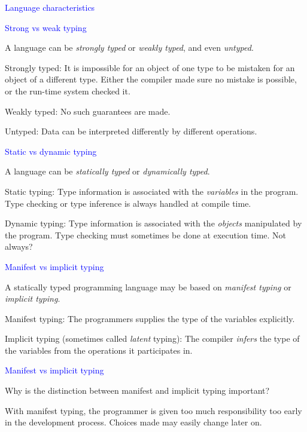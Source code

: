 \documentclass{slides}
\newcommand{\ti}[1]{\begin{center}\Large{\textcolor{blue}{#1}}\end{center}}
\begin{document}
\begin{slide}\ti{Language characteristics}

\vfill\end{slide}
\begin{slide}\ti{Strong vs weak typing}

A language can be \emph{strongly typed} or \emph{weakly typed}, and
even \emph{untyped}.

Strongly typed: It is impossible for an object of one type to be
mistaken for an object of a different type.  Either the compiler made
sure no mistake is possible, or the run-time system checked it.

Weakly typed: No such guarantees are made.

Untyped: Data can be interpreted differently by different operations.

\vfill\end{slide}
\begin{slide}\ti{Static vs dynamic typing}

A language can be \emph{statically typed} or \emph{dynamically
  typed}.

Static typing: Type information is associated with the
\emph{variables} in the program.  Type checking or type inference is
always handled at compile time.

Dynamic typing: Type information is associated with the \emph{objects}
manipulated by the program.  Type checking must sometimes be done at
execution time.  Not always?

\vfill\end{slide}
\begin{slide}\ti{Manifest vs implicit typing}

A statically typed programming language may be based on \emph{manifest
  typing} or \emph{implicit typing}.

Manifest typing: The programmers supplies the type of the variables
explicitly.

Implicit typing (sometimes called \emph{latent} typing): The compiler
\emph{infers} the type of the variables from the operations it
participates in.

\vfill\end{slide}
\begin{slide}\ti{Manifest vs implicit typing}

Why is the distinction between manifest and implicit typing important?

With manifest typing, the programmer is given too much responsibility
too early in the development process.  Choices made may easily change
later on.

\vfill\end{slide}
\end{document}
